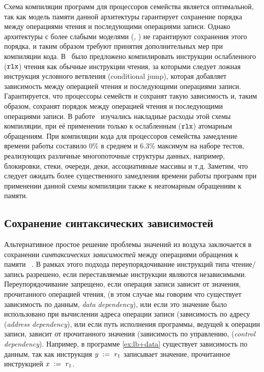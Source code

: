 Схема компиляции программ для процессоров семейства \Intel является оптимальной, 
так как модель памяти данной 
архитектуры гарантирует сохранение порядка 
между операциями чтения и последующими операциями записи. 
Однако архитектуры с более слабыми моделями (\ARM, \POWER)
не гарантируют сохранения этого порядка, 
и таким образом требуют принятия дополнительных мер при компиляции кода. 
В~\cite{Boehm-Demsky:MSPC14} было предложено компилировать 
инструкции ослабленного ($\mathtt{rlx}$) чтения как обычные инструкции чтения, 
за которыми следует ложная инструкция условного ветвления 
(conditional jump), которая добавляет зависимость 
между операцией чтения и последующими операциями записи. 
Гарантируется, что процессоры семейств \ARM и \POWER 
сохранят такую зависимость и, таким образом, 
сохранят порядок между операцией чтения и последующими операциями записи. 
В работе~\cite{Ou-Demsky:OOPSLA18} изучались 
накладные расходы этой схемы компиляции, 
при её применении только к ослабленным ($\mathtt{rlx}$) атомарным обращениям.
При компиляции кода для процессоров семейства  
замедление времени работы составило 0\% в среднем и 6.3\% максимум 
на наборе тестов, реализующих различные многопоточные 
структуры данных, например, блокировки, стеки, очереди, 
деки, ассоциативные массивы и т.д.
Заметим, что следует ожидать более существенного замедления
времени работы программ при применении данной схемы компиляции
также к неатомарным обращениям к памяти. 

\subsection{Сохранение синтаксических зависимостей}
\label{sec:analysis:deprf}

Альтернативное простое решение проблемы значений из воздуха 
заключается в сохранении \emph{синтаксических зависимостей}
между операциями обращения к памяти~%
\cite{Boehm-Demsky:MSPC14, Alglave-al:ASPLOS18}.
В рамках этого подхода переупорядочивание инструкций типа чтение/запись 
разрешено, если переставляемые инструкции являются независимыми. 
Переупорядочивание запрещено, если операция записи зависит 
от значения, прочитанного операцией чтения, 
(в этом случае мы говорим что существует зависимость по данным, \emph{data dependency}),
или если это значение было использовано при вычислении адреса операции записи 
(зависимость по адресу (\emph{address dependency}), 
или если путь исполнения программы, ведущей к операции записи, 
зависит от прочитанного значения 
(зависимость по управлению, (\emph{control dependency}).
Например, в программе \ref{ex:lb+data} 
существует зависимость по данным, так как 
инструкция $y\;:=_{}\;r_1$ записывает 
значение, прочитанное инструкцией $x\;:=_{}\;r_1$. 


